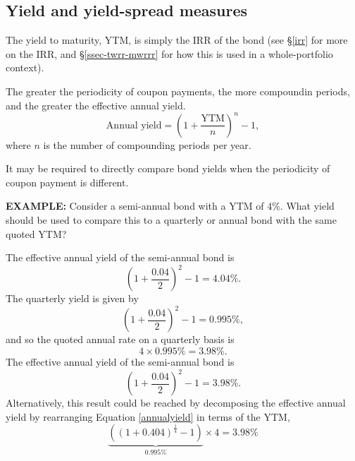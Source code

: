 \documentclass[../notes_compiled.tex]{subfiles}
\begin{document}
\subsection{Yield and yield-spread measures}
\begin{itemize}
\item The yield to maturity, YTM, is simply the IRR of the bond (see \S\ref{irr} for more on the IRR, and \S\ref{ssec-twrr-mwrrr} for how this is used in a whole-portfolio context).
\item The greater the periodicity of coupon payments, the more compoundin periods, and the greater the effective annual yield.
\begin{equation}
\text{Annual yield} = \left(1+\frac{\text{YTM}}{n}\right)^{n}-1, \label{annualyield}
\end{equation}
where $n$ is the number of compounding periods per year.
\item It may be required to directly compare bond yields when the periodicity of coupon payment is different.
{\color{RedViolet}
\item[] \textbf{EXAMPLE:} Consider a semi-annual bond with a YTM of 4\%. What yield should be used to compare this to a quarterly or annual bond with the same quoted YTM?
}
{\color{RoyalBlue}
\item[] The effective annual yield of the semi-annual bond is
\begin{equation*}
\left( 1 + \frac{0.04}{2}\right)^{2} -1 = 4.04\%.
\end{equation*}
The quarterly yield is given by
\begin{equation*}
\left( 1 + \frac{0.04}{2}\right)^{2} -1 = 0.995\%,
\end{equation*}
and so the quoted annual rate on a quarterly basis is
\begin{equation*}
4\times 0.995\%= 3.98\%.
\end{equation*}
The effective annual yield of the semi-annual bond is
\begin{equation*}
\left( 1 + \frac{0.04}{2}\right)^{2} -1 = 3.98\%.
\end{equation*}
Alternatively, this result could be reached by decomposing the effective annual yield by rearranging Equation \ref{annualyield} in terms of the YTM,
\begin{equation*}
\underbrace{\left(\left(1+0.404\right)^{\frac{1}{4}}-1\right)}_{0.995\%}\times4 = 3.98\%
\end{equation*}
}
\end{itemize}
\end{document}

